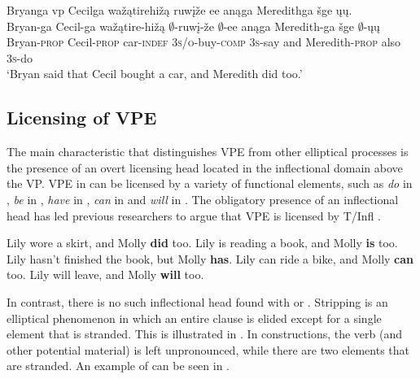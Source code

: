 \documentclass[output=paper]{LSP/langsci}
\begin{document}
\ea\label{ex:johnson:11} 
\glll Bryanga {\ob}{vp} Cecilga wažątirehižą ruwįže ee{\cb} anąga Meredithga šge {\ob}ųų{\cb}.\\
Bryan-ga {} Cecil-ga wažątire-hižą $\emptyset$-ruwį-že $\emptyset$-ee anąga Meredith-ga šge $\emptyset$-ųų\\
Bryan-\textsc{prop} {} Cecil-\textsc{prop} car-\textsc{indef} \textsc{3s/o}-buy-\textsc{comp} \textsc{3s}-say and Meredith-\textsc{prop} also \textsc{3s}-do\\
\trans `Bryan said that Cecil bought a car, and Meredith did too.'
\z


\subsection{Licensing of VPE}\label{sec:johnson:2.2}

The main characteristic that distinguishes VPE from other elliptical processes is the presence of an overt licensing head located in the inflectional domain above the VP. VPE in  can be licensed by a variety of functional elements, such as \emph{do} in , \emph{be} in , \emph{have} in , \emph{can} in  and \emph{will} in . The obligatory presence of an inflectional head has led previous researchers to argue that VPE is licensed by T/Infl \citep{Bresnan1976,Sag1976,Zagona1988,Lobeck1995}.

 
\ea\label{ex:johnson:12}
\ea\label{ex:johnson:12a}
Lily wore a skirt, and Molly \textbf{did} too.
\ex\label{ex:johnson:12b}
Lily is reading a book, and Molly \textbf{is} too.
\ex\label{ex:johnson:12c}
Lily hasn't finished the book, but Molly \textbf{has}.
\ex\label{ex:johnson:12d}
Lily can ride a bike, and Molly \textbf{can} too.
\ex\label{ex:johnson:12e} 
Lily will leave, and Molly \textbf{will} too.
\z
\z

In contrast, there is no such inflectional head found with  or . Stripping is an elliptical phenomenon in which an entire clause is elided except for a single element that is stranded. This is illustrated in . In  constructions, the verb (and other potential material) is left unpronounced, while there are two elements that are stranded. An example of  can be seen in .
 
\end{document}
